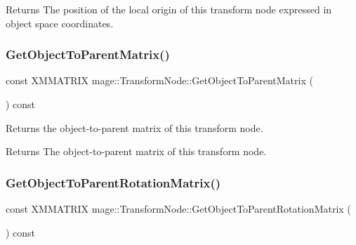 \begin{DoxyReturn}{Returns}
The position of the local origin of this transform node expressed in object space coordinates. 
\end{DoxyReturn}
\hypertarget{structmage_1_1_transform_node_a0056c77406b7c6fc29f50b1b0de69026}{}\label{structmage_1_1_transform_node_a0056c77406b7c6fc29f50b1b0de69026} 
\subsubsection{\texorpdfstring{Get\+Object\+To\+Parent\+Matrix()}{GetObjectToParentMatrix()}}
{\footnotesize\ttfamily const X\+M\+M\+A\+T\+R\+IX mage\+::\+Transform\+Node\+::\+Get\+Object\+To\+Parent\+Matrix (\begin{DoxyParamCaption}{ }\end{DoxyParamCaption}) const\hspace{0.3cm}{\ttfamily [noexcept]}}

Returns the object-\/to-\/parent matrix of this transform node.

\begin{DoxyReturn}{Returns}
The object-\/to-\/parent matrix of this transform node. 
\end{DoxyReturn}
\hypertarget{structmage_1_1_transform_node_a07d6171d757d2f7fbf0d2d59dbe531d9}{}\label{structmage_1_1_transform_node_a07d6171d757d2f7fbf0d2d59dbe531d9} 
\subsubsection{\texorpdfstring{Get\+Object\+To\+Parent\+Rotation\+Matrix()}{GetObjectToParentRotationMatrix()}}
{\footnotesize\ttfamily const X\+M\+M\+A\+T\+R\+IX mage\+::\+Transform\+Node\+::\+Get\+Object\+To\+Parent\+Rotation\+Matrix (\begin{DoxyParamCaption}{ }\end{DoxyParamCaption}) const\hspace{0.3cm}{\ttfamily [noexcept]}}

